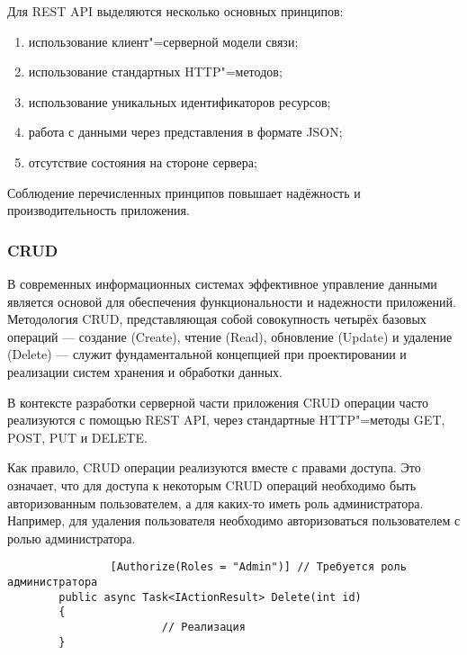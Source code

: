 Для REST API выделяются несколько основных принципов:
\begin{enumerate}
	\item{использование клиент"=серверной модели связи;}
	\item{использование стандартных HTTP"=методов;}
	\item{использование уникальных идентификаторов ресурсов;}
	\item{работа с данными через представления в формате JSON;}
	\item{отсутствие состояния на стороне сервера;}
\end{enumerate}

Соблюдение перечисленных принципов повышает надёжность и производительность приложения.

\subsubsection{CRUD}
В современных информационных системах эффективное управление данными является основой для обеспечения функциональности и надежности приложений. Методология CRUD, представляющая собой совокупность четырёх базовых операций --- создание (Create), чтение (Read), обновление (Update) и удаление (Delete) --- служит фундаментальной концепцией при проектировании и реализации систем хранения и обработки данных. 

В контексте разработки серверной части приложения CRUD операции часто реализуются с помощью REST API, через стандартные HTTP"=методы GET, POST, PUT и DELETE. \cite{CRUD}

Как правило, CRUD операции реализуются вместе с правами доступа. Это означает, что для доступа к некоторым CRUD операций необходимо быть авторизованным пользователем, а для каких-то иметь роль администратора. Например, для удаления пользователя необходимо авторизоваться пользователем с ролью администратора.

\begin{verbatim}
				[Authorize(Roles = "Admin")] // Требуется роль администратора
        public async Task<IActionResult> Delete(int id)
        {
						// Реализация
        }
\end{verbatim}
